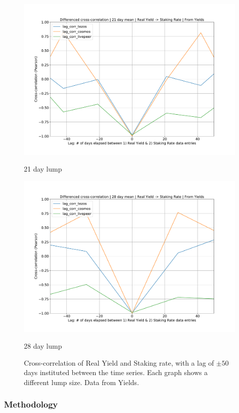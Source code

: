 \documentclass[longbibliography,nofootinbib]{revtex4-1}
\begin{document}
\begin{figure}[h!]
\begin{minipage}{0.5\textwidth}
        \includegraphics[width=1\textwidth]{graphs/CrossCorr_Yields_DIF_21.pdf}
        \caption{21 day lump}
    \end{minipage}\hfill
    \begin{minipage}{0.5\textwidth}
        \centering
        \includegraphics[width=1\textwidth]{graphs/CrossCorr_Yields_DIF_28.pdf}
        \caption{28 day lump}
    \end{minipage}
    \caption{Cross-correlation of Real Yield and Staking rate, with a lag of $\pm50$ days instituted between the time series. Each graph shows a different lump size. Data from Yields.}
\end{figure}

\subsubsection{Methodology}
\end{document}
